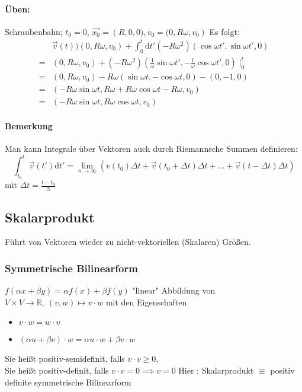 \documentclass[a4paper]{scrartcl}
\theoremstyle{definition}
\theoremstyle{plain}
\theoremstyle{remark}
\theoremstyle{remark}
\begin{document}
\paragraph{Üben:}
\label{sec-2-5-1-2}
Schraubenbahn; $t_0 = 0$, $\vec{x_0} = \left(R, 0, 0), v_0 = (0, R\omega, v_0\right)$
Es folgt:
\begin{align*}
&\vec{v}(t) ) (0, R\omega, v_0) + \int_0^t \mathrm{d}t' ( -R\omega^2)(\cos{\omega t', \sin{\omega t'}, 0})\\
=& (0, R\omega, v_0) + (-R\omega^2)(\frac{1}{\omega}\sin{\omega t'}, -\frac{1}{\omega}\cos{\omega t'}, 0)\mid_0^t\\
=& (0, R\omega, v_0) - R\omega (\sin{\omega t}, -\cos{\omega t}, 0) - (0, -1, 0)\\
=& (-R\omega\sin{\omega t}, R\omega + R\omega\cos{\omega t} - R\omega, v_0)\\
=& (-R\omega\sin{\omega t}, R\omega\cos{\omega t}, v_0)
\end{align*}
\paragraph{Bemerkung}
\label{sec-2-5-1-3}
Man kann Integrale über Vektoren auch durch Riemannsche Summen definieren:
\[\int_{t_0}^t \vec{v}(t')\mathrm{d}t' = \lim_{n\to\infty} (v(t_0)\Delta t + \vec{v}(t_0 + \Delta t)\Delta t + \ldots + \vec{v}(t - \Delta t)\Delta t)\]
mit $\Delta t = \frac{t - t_0}{N}$
\subsection{Skalarprodukt}
\label{sec-2-6}
Führt von Vektoren wieder zu nicht-vektoriellen (Skalaren) Größen.
\subsubsection{Symmetrische Bilinearform}
\label{sec-2-6-1}
$f(\alpha x + \beta y) = \alpha f(x) + \beta f(y)$ "linear"
Abbildung von $V\times V \to \mathbb{R},~(v,w) \mapsto v\cdot w$ mit den Eigenschaften
\begin{itemize}
\item $v\cdot w = w\cdot v$
\item $(\alpha u + \beta v) \cdot w = \alpha u\cdot w + \beta v\cdot w$
\end{itemize}
Sie heißt positiv-semidefinit, falls  $v\cdot v\geq 0$, \\
    Sie heißt positiv-definit, falls  $v\cdot v = 0 \implies v = 0$
Hier : Skalarprodukt $\equiv$ positiv definite symmetrische Bilinearform
\end{document}
